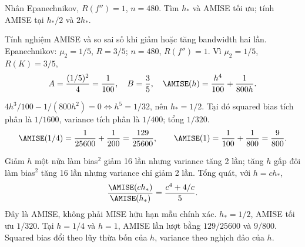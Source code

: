 \begin{problem}\label{k:43}
Nhân Epanechnikov, $R(f'')=1$, $n=480$. Tìm $h_*$ và AMISE tối ưu; tính AMISE tại $h_*/2$ và $2h_*$.
\end{problem}
\begin{solution}
Tính nghiệm AMISE và so sai số khi giảm hoặc tăng bandwidth hai lần.
Epanechnikov: $\mu_2=1/5$, $R=3/5$; $n=480$, $R(f'')=1$.
Vì $\mu_2=1/5$, $R(K)=3/5$,
\[
 A=\frac{(1/5)^2}{4}=\frac1{100},\quad B=\frac35,
 \quad\AMISE(h)=\frac{h^4}{100}+\frac1{800h}.
\]

$4h^3/100-1/(800h^2)=0\iff h^5=1/32$, nên $h_*=1/2$.
Tại đó squared bias tích phân là $1/1600$, variance tích phân là $1/400$; tổng $1/320$.
\[
 \AMISE(1/4)=\frac1{25600}+\frac1{200}=\frac{129}{25600},\qquad
 \AMISE(1)=\frac1{100}+\frac1{800}=\frac9{800}.
\]

Giảm $h$ một nửa làm bias$^2$ giảm 16 lần nhưng variance tăng 2 lần; tăng $h$ gấp đôi làm bias$^2$ tăng 16 lần nhưng variance chỉ giảm 2 lần.
Tổng quát, với $h=ch_*$,
\[
 \frac{\AMISE(ch_*)}{\AMISE(h_*)}=\frac{c^4+4/c}{5}.
\]
Đây là AMISE, không phải MISE hữu hạn mẫu chính xác.
$h_*=1/2$, AMISE tối ưu $1/320$. Tại $h=1/4$ và $h=1$, AMISE lần lượt bằng $129/25600$ và $9/800$.
Squared bias đổi theo lũy thừa bốn của $h$, variance theo nghịch đảo của $h$.
\end{solution}

